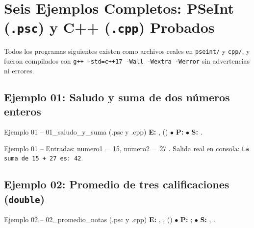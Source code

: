 \documentclass[11pt,letterpaper]{article}
\begin{document}
\section{Seis Ejemplos Completos: PSeInt (\texorpdfstring{\texttt{.psc}}{.psc}) y C++ (\texorpdfstring{\texttt{.cpp}}{.cpp}) Probados}

Todos los programas siguientes existen como archivos reales en \texttt{pseint/} y \texttt{cpp/}, y fueron compilados con \texttt{g++ -std=c++17 -Wall -Wextra -Werror} sin advertencias ni errores.

\subsection{Ejemplo 01: Saludo y suma de dos números enteros}
\begin{analisis}{Ejemplo 01 -- 01\_saludo\_y\_suma (.psc y .cpp)}
\textbf{E:} ,  () \quad $\bullet$ \textbf{P:}  \quad $\bullet$ \textbf{S:} .
\end{analisis}




\begin{pruebaescritorio}{Ejemplo 01 -- Entradas: numero1 = 15, numero2 = 27}
. Salida real en consola: \texttt{La suma de 15 + 27 es: 42}.
\end{pruebaescritorio}

\subsection{Ejemplo 02: Promedio de tres calificaciones (\texorpdfstring{\texttt{double}}{double})}
\begin{analisis}{Ejemplo 02 -- 02\_promedio\_notas (.psc y .cpp)}
\textbf{E:} , ,  () \quad $\bullet$ \textbf{P:} ;  \quad $\bullet$ \textbf{S:} , .
\end{analisis}



\end{document}
